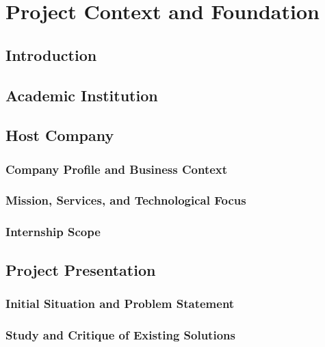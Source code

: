 \documentclass[12pt,a4paper]{report}
\begin{document}
\chapter{Project Context and Foundation}
\label{ch:context}

\section{Introduction}
\label{sec:ch1-intro}

\section{Academic Institution}
\label{sec:institution}

\section{Host Company}
\label{sec:host-company}

  \subsection{Company Profile and Business Context}
  \label{subsec:company-overview}

  \subsection{Mission, Services, and Technological Focus}
  \label{subsec:mission-vision}

  \subsection{Internship Scope}
  \label{subsec:internship-scope}

\section{Project Presentation}
\label{sec:project-presentation}

  \subsection{Initial Situation and Problem Statement}
  \label{subsec:problem}

  \subsection{Study and Critique of Existing Solutions}
  \label{subsec:existing-solutions}
\end{document}
